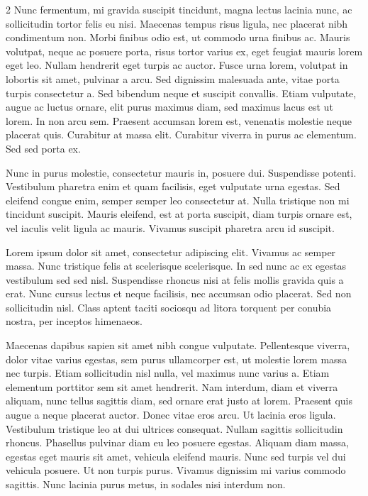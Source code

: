 \documentclass[9pt,]{book}
\begin{document}
\begin {multicols}{2}
Nunc fermentum, mi gravida suscipit tincidunt, magna lectus lacinia
nunc, ac sollicitudin tortor felis eu nisi. Maecenas tempus risus
ligula, nec placerat nibh condimentum non. Morbi finibus odio est, ut
commodo urna finibus ac. Mauris volutpat, neque ac posuere porta, risus
tortor varius ex, eget feugiat mauris lorem eget leo. Nullam hendrerit
eget turpis ac auctor. Fusce urna lorem, volutpat in lobortis sit amet,
pulvinar a arcu. Sed dignissim malesuada ante, vitae porta turpis
consectetur a. Sed bibendum neque et suscipit convallis. Etiam
vulputate, augue ac luctus ornare, elit purus maximus diam, sed maximus
lacus est ut lorem. In non arcu sem. Praesent accumsan lorem est,
venenatis molestie neque placerat quis. Curabitur at massa elit.
Curabitur viverra in purus ac elementum. Sed sed porta ex.

Nunc in purus molestie, consectetur mauris in, posuere dui. Suspendisse
potenti. Vestibulum pharetra enim et quam facilisis, eget vulputate urna
egestas. Sed eleifend congue enim, semper semper leo consectetur at.
Nulla tristique non mi tincidunt suscipit. Mauris eleifend, est at porta
suscipit, diam turpis ornare est, vel iaculis velit ligula ac mauris.
Vivamus suscipit pharetra arcu id suscipit.

Lorem ipsum dolor sit amet, consectetur adipiscing elit. Vivamus ac
semper massa. Nunc tristique felis at scelerisque scelerisque. In sed
nunc ac ex egestas vestibulum sed sed nisl. Suspendisse rhoncus nisi at
felis mollis gravida quis a erat. Nunc cursus lectus et neque facilisis,
nec accumsan odio placerat. Sed non sollicitudin nisl. Class aptent
taciti sociosqu ad litora torquent per conubia nostra, per inceptos
himenaeos.

Maecenas dapibus sapien sit amet nibh congue vulputate. Pellentesque
viverra, dolor vitae varius egestas, sem purus ullamcorper est, ut
molestie lorem massa nec turpis. Etiam sollicitudin nisl nulla, vel
maximus nunc varius a. Etiam elementum porttitor sem sit amet hendrerit.
Nam interdum, diam et viverra aliquam, nunc tellus sagittis diam, sed
ornare erat justo at lorem. Praesent quis augue a neque placerat auctor.
Donec vitae eros arcu. Ut lacinia eros ligula. Vestibulum tristique leo
at dui ultrices consequat. Nullam sagittis sollicitudin rhoncus.
Phasellus pulvinar diam eu leo posuere egestas. Aliquam diam massa,
egestas eget mauris sit amet, vehicula eleifend mauris. Nunc sed turpis
vel dui vehicula posuere. Ut non turpis purus. Vivamus dignissim mi
varius commodo sagittis. Nunc lacinia purus metus, in sodales nisi
interdum non.


\end{multicols}
\end{document}
